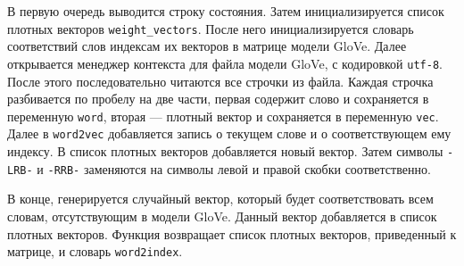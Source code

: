 В первую очередь выводится строку состояния. Затем инициализируется список плотных векторов \texttt{weight\_vectors}. После него инициализируется словарь соответствий слов индексам их векторов в матрице модели GloVe. Далее открывается менеджер контекста для файла модели GloVe, с кодировкой \texttt{utf-8}. После этого последовательно читаются все строчки из файла. Каждая строчка разбивается по пробелу на две части, первая содержит слово и сохраняется в переменную \texttt{word}, вторая --- плотный вектор и сохраняется в переменную \texttt{vec}. Далее в \texttt{word2vec} добавляется запись о текущем слове и о соответствующем ему индексу. В список плотных векторов добавляется новый вектор. Затем символы \texttt{-LRB-} и \texttt{-RRB-} заменяются на символы левой и правой скобки соответственно.

В конце, генерируется случайный вектор, который будет соответствовать всем словам, отсутствующим в модели GloVe. Данный вектор добавляется в список плотных векторов. Функция возвращает список плотных векторов, приведенный к матрице, и словарь \texttt{word2index}.